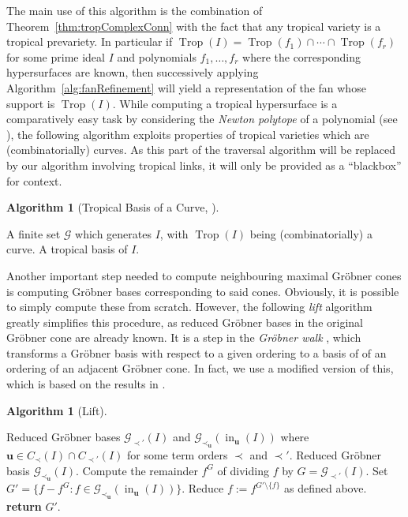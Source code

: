 \documentclass[
  paper=a4,
  titlepage,
  bibliography=totoc,
  pagesize=pdftex
]{scrartcl}
\numberwithin{figure}{section}
\numberwithin{equation}{section}
\numberwithin{table}{section}
\let\vec\mathbf
\DeclareMathOperator{\Trop}{Trop}
\DeclareMathOperator{\initial}{in}
\theoremstyle{definition}
\newtheorem{algo}[definition]{Algorithm}
\numberwithin{definition}{section}
\begin{document}
The main use of this algorithm is the combination of Theorem~\ref{thm:tropComplexConn}
with the fact that any tropical variety is a tropical prevariety. In particular if
$\Trop(I) = \Trop(f_1) \cap \cdots \cap \Trop(f_r)$ for some prime ideal $I$ and
polynomials $f_1, \dots, f_r$ where the corresponding hypersurfaces are known, then
successively applying Algorithm~\ref{alg:fanRefinement} will yield a representation of the
fan whose support is $\Trop(I)$. While computing a tropical hypersurface is a
comparatively easy task by considering the \emph{Newton polytope} of a polynomial (see
\cite[Algorithm~4.3]{compTropVar}), the following algorithm exploits properties of
tropical varieties which are (combinatorially) curves. As this part of the traversal
algorithm will be replaced by our algorithm involving tropical links, it will only be
provided as a \enquote{blackbox} for context.

\begin{algo}[Tropical Basis of a Curve, {\cite[Algorihm~4.8]{compTropVar}}]\
  \label{alg:tropBasisCurve}
  \begin{algorithmic}[1]
    \Require A finite set $\mathcal G$ which generates $I$, with $\Trop(I)$ being
      (combinatorially) a curve.
    \Ensure A tropical basis of $I$.
  \end{algorithmic}
\end{algo}

Another important step needed to compute neighbouring maximal Gröbner cones is computing
Gröbner bases corresponding to said cones. Obviously, it is possible to simply compute
these from scratch. However, the following \emph{lift} algorithm greatly simplifies this
procedure, as reduced Gröbner bases in the original Gröbner cone are already known. It is
a step in the \emph{Gröbner walk} \cite{groebWalk}, which transforms a Gröbner basis with
respect to a given ordering to a basis of of an ordering of an adjacent Gröbner cone. In
fact, we use a modified version of this, which is based on the results in
\cite[Proposition~3.2]{genericWalk}.

\begin{algo}[Lift]\
  \label{alg:lift}
  \begin{algorithmic}[1]
    \Require Reduced Gröbner bases $\mathcal G_{\prec'}(I)$ and $\mathcal G_{\prec_{\vec
      u}}(\initial_{\vec u}(I))$ where $\vec u \in C_{\prec}(I)\cap C_{\prec'}(I)$ for
      some term orders $\prec$ and $\prec'$.
    \Ensure Reduced Gröbner basis $\mathcal G_{\prec_{\vec u}}(I)$.
    \For{$f \in \mathcal G_{\prec_{\vec u}}(\initial_{\vec u}(I))$}
      \State Compute the remainder $f^G$ of dividing $f$ by $G =  \mathcal G_{\prec'}(I)$.
    \EndFor
    \State Set $G' = \{ f-f^G : f \in \mathcal G_{\prec_{\vec u}}(\initial_{\vec u}(I)) \}$.
      \State Reduce $f := f^{G'\setminus\{f\}}$ as defined above.
    \EndFor
    \State \textbf{return} $G'$.
  \end{algorithmic}
\end{algo}
\end{document}
